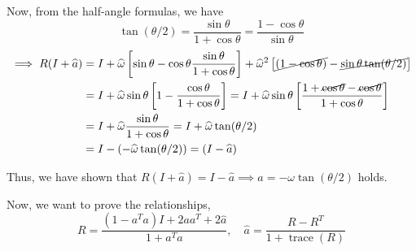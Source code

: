 Now, from the half-angle formulas, we have
\begin{equation*}
    \tan (\theta / 2)
    =
    \frac{\sin \theta}{1 + \cos \theta}
    =
    \frac{1 - \cos \theta}{\sin \theta}
\end{equation*}
\begin{align*}
    \implies
    R(I + \widehat{a})
     & =
    I + \widehat{\omega} \left[ \sin \theta - \cos \theta \frac{\sin \theta}{1 + \cos \theta} \right] + \widehat{\omega}^{2} \left[\cancel{(1 - \cos \theta)} - \cancel{\sin \theta \tan(\theta / 2)} \right]
    \\ & =
    I + \widehat{\omega} \sin \theta \left[ 1 - \frac{\cos \theta}{1 + \cos \theta} \right]
    =
    I + \widehat{\omega} \sin \theta \left[ \frac{1 + \cancel{\cos \theta} - \cancel{\cos \theta}}{1 + \cos \theta} \right]
    \\ & =
    I + \widehat{\omega} \frac{\sin \theta}{1 + \cos \theta}
    =
    I + \widehat{\omega} \tan(\theta / 2)
    \\ & =
    I - (-\widehat{\omega} \tan(\theta / 2))
    =
    (I - \widehat{a})
\end{align*}

Thus, we have shown that \( R(I + \widehat{a}) = I - \widehat{a} \implies \boxed{a = -\omega \tan(\theta / 2)} \) holds.

\vspace{1em}
Now, we want to prove the relationships,
\[
    R = \frac{(1 - a^{T} a) I + 2 a a^{T} + 2 \widehat{a}}{1 + a^{T} a}, \quad \widehat{a} = \frac{R - R^{T}}{1 + \operatorname{trace}(R)}
\]
